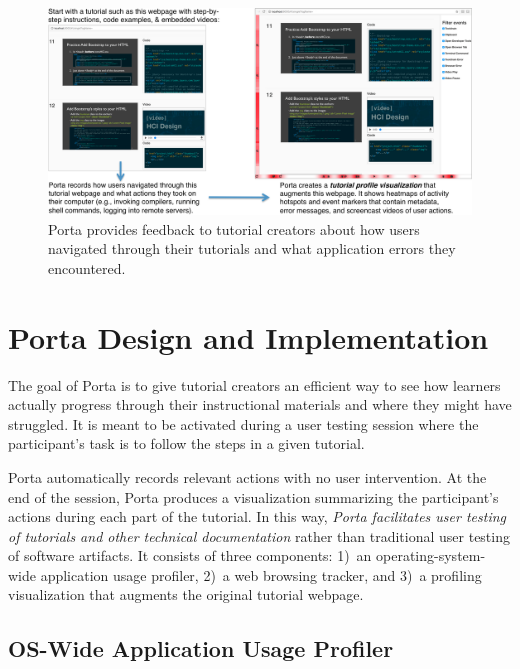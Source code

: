 \begin{figure}[h!]
\centering
\includegraphics[width=1\columnwidth]{figures/porta/porta-overview.png}

\caption{Porta provides feedback to tutorial creators about how users
navigated through their tutorials and what application errors they
encountered.}

\vspace{-0.25em} %

\label{fig:porta-overview}
\end{figure}

\section{Porta Design and Implementation}

The goal of Porta is to give tutorial creators an efficient way to see
how learners actually progress through their instructional materials and
where they might have struggled. It is meant to be activated during a
user testing session where the participant's task is to follow the steps
in a given tutorial.

Porta automatically records relevant actions with no user intervention.
At the end of the session, Porta produces a visualization summarizing
the participant's actions during each part of the tutorial.
%
In this way, \emph{Porta facilitates user testing of tutorials and other
technical documentation} rather than traditional user testing of
software artifacts.
%
It consists of three components: 1)~an operating-system-wide application
usage profiler, 2)~a web browsing tracker, and 3)~a profiling
visualization that augments the original tutorial webpage.


\subsection{OS-Wide Application Usage Profiler}

